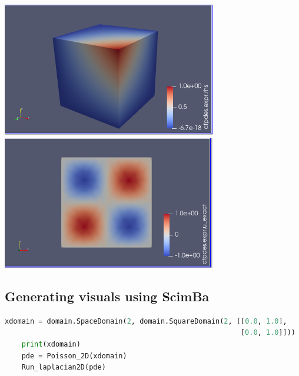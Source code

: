 \documentclass[12pt]{article}
\begin{document}
\begin{frame}{}
    \begin{center}
        \includegraphics[width=0.7\textwidth]{images/paraview 3d.png}
        \includegraphics[width=0.7\textwidth]{images/laplacian2d2d.png}
    \end{center}
\end{frame}

\newpage

\subsection{Generating visuals using ScimBa}
\begin{lstlisting}[language=Python,caption={},frame=single, backgroundcolor=\color{gray!10}, basicstyle=\footnotesize,rulecolor=\color{blue}, framexleftmargin=3pt, commentstyle=\color{mygreen}, keywordstyle=\color{blue}]
    xdomain = domain.SpaceDomain(2, domain.SquareDomain(2, [[0.0, 1.0], 
                                                        [0.0, 1.0]]))
    print(xdomain)
    pde = Poisson_2D(xdomain)
    Run_laplacian2D(pde)
    
\end{lstlisting}
    
\end{document}
